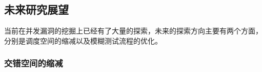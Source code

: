 



\subsection{未来研究展望}

当前在并发漏洞的挖掘上已经有了大量的探索，未来的探索方向主要有两个方面，分别是调度空间的缩减以及模糊测试流程的优化。

\subsubsection{交错空间的缩减}

